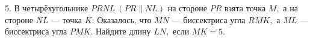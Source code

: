 5. В четырёхугольнике $PRNL\ (PR\parallel NL)$ на стороне $PR$ взята точка $M,$ а на стороне $NL$ --- точка $K.$ Оказалось, что $MN$ --- биссектриса угла $RMK,$ а $ML$ --- биссектриса угла $PMK.$ Найдите длину $LN,$ если $MK=5.$\\
